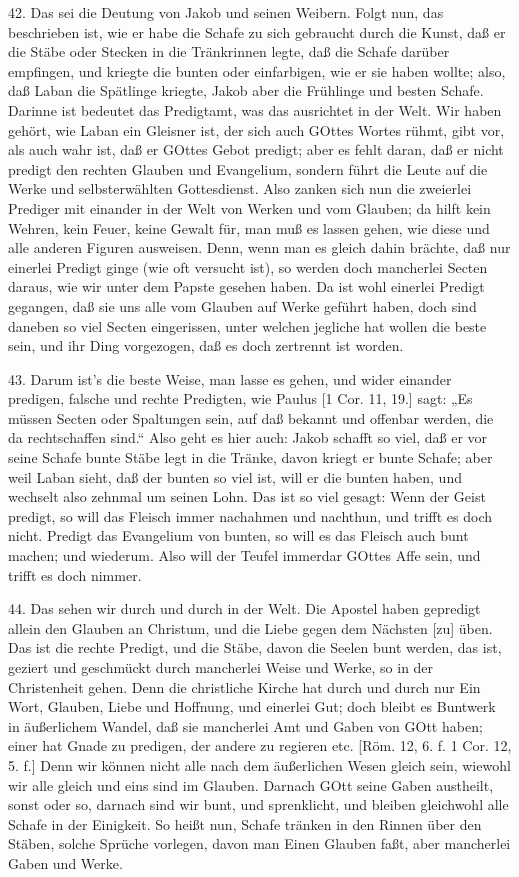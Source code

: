 42. Das sei die Deutung von Jakob und seinen Weibern. Folgt nun, das beschrieben ist, wie er habe die Schafe zu sich gebraucht durch die Kunst, daß er die Stäbe oder Stecken in die Tränkrinnen legte, daß die Schafe darüber empfingen, und kriegte die bunten oder einfarbigen, wie er sie haben wollte; also, daß Laban die Spätlinge kriegte, Jakob aber die Frühlinge und besten Schafe. Darinne ist bedeutet das Predigtamt, was das ausrichtet in der Welt. Wir haben gehört, wie Laban ein Gleisner ist, der sich auch GOttes Wortes rühmt, gibt vor, als auch wahr ist, daß er GOttes Gebot predigt; aber es fehlt daran, daß er nicht predigt den rechten Glauben und Evangelium, sondern führt die Leute auf die Werke und selbsterwählten Gottesdienst. Also zanken sich nun die zweierlei Prediger mit einander in der Welt von Werken und vom Glauben; da hilft kein Wehren, kein Feuer, keine Gewalt für, man muß es lassen gehen, wie diese und alle anderen Figuren ausweisen. Denn, wenn man es gleich dahin brächte, daß nur einerlei Predigt ginge (wie oft versucht ist), so werden doch mancherlei Secten daraus, wie wir unter dem Papste gesehen haben. Da ist wohl einerlei Predigt gegangen, daß sie uns alle vom Glauben auf Werke geführt haben, doch sind daneben so viel Secten eingerissen, unter welchen jegliche hat wollen die beste sein, und ihr Ding vorgezogen, daß es doch zertrennt ist worden.

43. Darum ist's die beste Weise, man lasse es gehen, und wider einander predigen, falsche und rechte Predigten, wie Paulus [1 Cor. 11, 19.] sagt: „Es müssen Secten oder Spaltungen sein, auf daß bekannt und offenbar werden, die da rechtschaffen sind.“ Also geht es hier auch: Jakob schafft so viel, daß er vor seine Schafe bunte Stäbe legt in die Tränke, davon kriegt er bunte Schafe; aber weil Laban sieht, daß der bunten so viel ist, will er die bunten haben, und wechselt also zehnmal um seinen Lohn. Das ist so viel gesagt: Wenn der Geist predigt, so will das Fleisch immer nachahmen und nachthun, und trifft es doch nicht. Predigt das Evangelium von bunten, so will es das Fleisch auch bunt machen; und wiederum. Also will der Teufel immerdar GOttes Affe sein, und trifft es doch nimmer.

44. Das sehen wir durch und durch in der Welt. Die Apostel haben gepredigt allein den Glauben an Christum, und die Liebe gegen dem Nächsten [zu] üben. Das ist die rechte Predigt, und die Stäbe, davon die Seelen bunt werden, das ist, geziert und geschmückt durch mancherlei Weise und Werke, so in der Christenheit gehen. Denn die christliche Kirche hat durch und durch nur Ein Wort, Glauben, Liebe und Hoffnung, und einerlei Gut; doch bleibt es Buntwerk in äußerlichem Wandel, daß sie mancherlei Amt und Gaben von GOtt haben; einer hat Gnade zu predigen, der andere zu regieren etc. [Röm. 12, 6. f. 1 Cor. 12, 5. f.] Denn wir können nicht alle nach dem äußerlichen Wesen gleich sein, wiewohl wir alle gleich und eins sind im Glauben. Darnach GOtt seine Gaben austheilt, sonst oder so, darnach sind wir bunt, und sprenklicht, und bleiben gleichwohl alle Schafe in der Einigkeit. So heißt nun, Schafe tränken in den Rinnen über den Stäben, solche Sprüche vorlegen, davon man Einen Glauben faßt, aber mancherlei Gaben und Werke.

